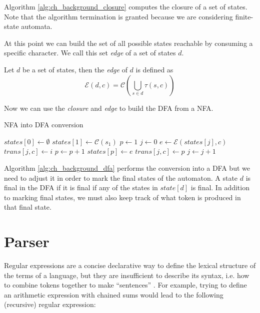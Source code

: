 Algorithm \ref{alg:ch_background_closure} computes the closure of a set of states. Note that the algorithm termination is granted because we are considering finite-state automata.

At this point we can build the set of all possible states reachable by consuming a specific character. We call this set \textit{edge} of a set of states $d$. 

\begin{definition}
	Let $d$ be a set of states, then the \textit{edge} of $d$ is defined as
	\begin{equation*}
		\mathcal{E}(d,c) = \mathcal{C}\left(\bigcup_{s \in d}\tau(s,c)\right)
	\end{equation*}
\end{definition}

\noindent
Now we can use the \textit{closure} and \textit{edge} to build the DFA from a NFA.

\begin{algorithm}
	\caption{NFA into DFA conversion}
	\label{alg:ch_background_dfa}
	\begin{algorithmic}
		\State $states[0] \gets \emptyset$
		\State $states[1] \gets \mathcal{C}(s_{1})$
		\State $p \gets 1$
		\State $j \gets 0$
				\State $e \gets \mathcal{E}(states[j],c)$
					\State $trans[j,c] \gets i$
				\Else
					\State $p \gets p + 1$
					\State $states[p] \gets e$
					\State $trans[j,c] \gets p$
				\EndIf
			\EndFor
			\State $j \gets j + 1$
		\EndWhile
	\end{algorithmic}
\end{algorithm}

\noindent
Algorithm \ref{alg:ch_background_dfa} performs the conversion into a DFA but we need to adjust it in order to mark the final states of the automaton. A state $d$ is final in the DFA if it is final if any of the states in $state[d]$ is final. In addition to marking final states, we must also keep track of what token is produced in that final state.

\section{Parser}
\label{sec:ch_background_parser}
Regular expressions are a concise declarative way to define the lexical structure of the terms of a language, but they are insufficient to describe its syntax, i.e. how to combine tokens together to  make ``sentences'' \cite{aho2007compilers, appel2002javacompiler}. For example, trying to define an arithmetic expression with chained sums would lead to the following (recursive) regular expression:

